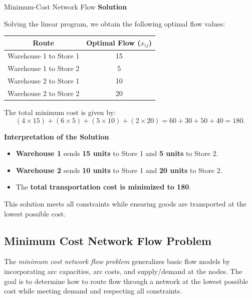 \begin{examplewithallcode}{Minimum-Cost Network Flow}
\textbf{Solution}

Solving the linear program, we obtain the following optimal flow values:

    \begin{tabular}{|c|c|}
        \hline
        Route & Optimal Flow ($x_{ij}$) \\
        \hline
        Warehouse 1 to Store 1 & 15 \\
        Warehouse 1 to Store 2 & 5 \\
        Warehouse 2 to Store 1 & 10 \\
        Warehouse 2 to Store 2 & 20 \\
        \hline
    \end{tabular}
\par{}\label{tab:modeling-sums-continued-tab02}%


The total minimum cost is given by:
\[
(4 \times 15) + (6 \times 5) + (5 \times 10) + (2 \times 20) = 60 + 30 + 50 + 40 = 180.
\]

\textbf{Interpretation of the Solution}

\begin{itemize}
    \item \textbf{Warehouse 1} sends \textbf{15 units} to Store 1 and \textbf{5 units} to Store 2.
    \item \textbf{Warehouse 2} sends \textbf{10 units} to Store 1 and \textbf{20 units} to Store 2.
    \item The \textbf{total transportation cost is minimized to 180}.
\end{itemize}

This solution meets all constraints while ensuring goods are transported at the lowest possible cost.

\end{examplewithallcode}
\newpage

\subsection{Minimum Cost Network Flow Problem}
\label{sec:min-cost-network-flow}

The \emph{minimum cost network flow problem} generalizes basic flow models by incorporating arc capacities, arc costs, and supply/demand at the nodes. The goal is to determine how to route flow through a network at the lowest possible cost while meeting demand and respecting all constraints.

